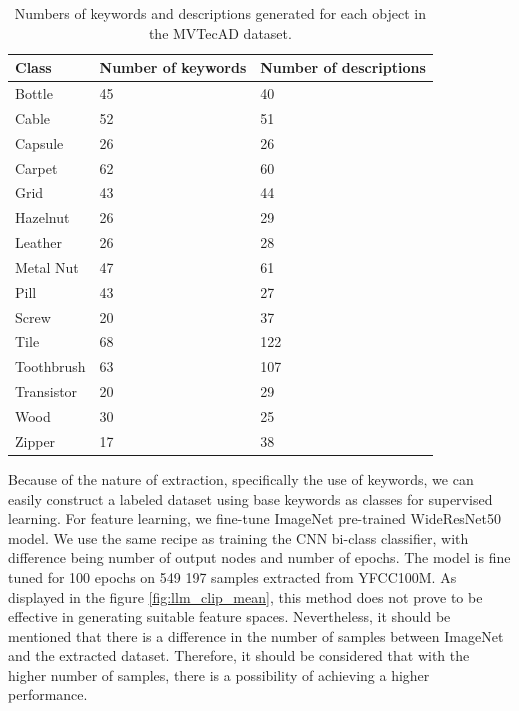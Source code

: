 \begin{table}[h]
\begin{center}
\begin{tabular}{lll}
\hline 
\textbf{Class} & \textbf{Number of keywords} & \textbf{Number of descriptions} \\
\hline\hline
Bottle & 45 & 40 \\
Cable & 52 & 51 \\
Capsule & 26 & 26 \\
Carpet & 62 & 60 \\
Grid & 43 & 44 \\
Hazelnut & 26 & 29 \\
Leather & 26 & 28 \\
Metal Nut & 47 & 61 \\
Pill & 43 & 27 \\
Screw & 20 & 37 \\
Tile & 68 & 122 \\
Toothbrush & 63 & 107 \\
Transistor & 20 & 29 \\
Wood & 30 & 25 \\
Zipper & 17 & 38 \\
\hline
\end{tabular}
\end{center}
\caption{Numbers of keywords and descriptions generated for each object in the MVTecAD\cite{mvtecad} dataset.}
\label{tab:gpt_keywords}
\end{table}

Because of the nature of extraction, specifically the use of keywords, we can easily construct a labeled dataset using base keywords as classes for supervised learning. For feature learning, we fine-tune ImageNet pre-trained WideResNet50 model. We use the same recipe as training the CNN bi-class classifier, with difference being number of output nodes and number of epochs. The model is fine tuned for 100 epochs on 549 197 samples extracted from YFCC100M. As displayed in the figure \ref{fig:llm_clip_mean}, this method does not prove to be effective in generating suitable feature spaces. Nevertheless, it should be mentioned that there is a difference in the number of samples between ImageNet and the extracted dataset. Therefore, it should be considered that with the higher number of samples, there is a possibility of achieving a higher performance.

